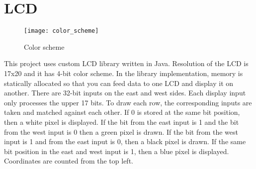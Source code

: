 \documentclass[./main.tex]{subfiles}
\begin{document}
	\section{LCD}
	\begin{figure}[h]
		\centering
		\texttt{[image: color\_scheme]}
		\label{fig:img1}
		\caption{Color scheme}
	\end{figure}
	This project uses custom LCD library written in Java. Resolution of the LCD is 17x20 and it has 4-bit color scheme. In the library implementation, memory is statically allocated so that you can feed data to one LCD and display it on another. There are 32-bit inputs on the east and west sides. Each display input only processes the upper 17 bits. To draw each row, the corresponding inputs are taken and matched against each other. If 0 is stored at the same bit position, then a white pixel is displayed. If the bit from the east input is 1 and the bit from the west input is 0 then a green pixel is drawn. If the bit from the west input is 1 and from the east input is 0, then a black pixel is drawn. If the same bit position in the east and west input is 1, then a blue pixel is displayed. Coordinates are counted from the top left.
	
\end{document}
